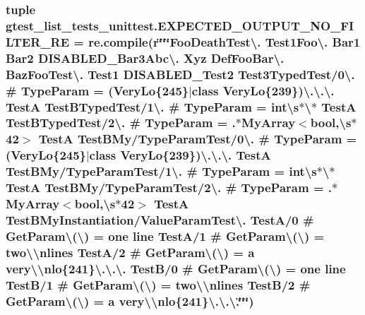 \hypertarget{namespacegtest__list__tests__unittest_a57e38bc2bb7e78ba6b2ae48a1569d1f3}{
\subsubsection[{E\-X\-P\-E\-C\-T\-E\-D\-\_\-\-O\-U\-T\-P\-U\-T\-\_\-\-N\-O\-\_\-\-F\-I\-L\-T\-E\-R\-\_\-\-R\-E}]{\setlength{\rightskip}{0pt plus 5cm}tuple gtest\-\_\-list\-\_\-tests\-\_\-unittest.\-E\-X\-P\-E\-C\-T\-E\-D\-\_\-\-O\-U\-T\-P\-U\-T\-\_\-\-N\-O\-\_\-\-F\-I\-L\-T\-E\-R\-\_\-\-R\-E = re.\-compile(r\char`\"{}\char`\"{}\char`\"{}Foo\-Death\-Test\textbackslash{}. Test1\-Foo\textbackslash{}. Bar1 Bar2 D\-I\-S\-A\-B\-L\-E\-D\-\_\-\-Bar3\-Abc\textbackslash{}. Xyz Def\-Foo\-Bar\textbackslash{}. Baz\-Foo\-Test\textbackslash{}. Test1 D\-I\-S\-A\-B\-L\-E\-D\-\_\-\-Test2 Test3\-Typed\-Test/0\textbackslash{}. \# Type\-Param = (Very\-Lo\{245\}$\vert$class Very\-Lo\{239\})\textbackslash{}.\textbackslash{}.\textbackslash{}. Test\-A Test\-B\-Typed\-Test/1\textbackslash{}. \# Type\-Param = int\textbackslash{}s$\ast$\textbackslash{}$\ast$ Test\-A Test\-B\-Typed\-Test/2\textbackslash{}. \# Type\-Param = .$\ast${\bf My\-Array}$<$bool,\textbackslash{}s$\ast$42$>$ Test\-A Test\-B\-My/{\bf Type\-Param\-Test}/0\textbackslash{}. \# Type\-Param = (Very\-Lo\{245\}$\vert$class Very\-Lo\{239\})\textbackslash{}.\textbackslash{}.\textbackslash{}. Test\-A Test\-B\-My/{\bf Type\-Param\-Test}/1\textbackslash{}. \# Type\-Param = int\textbackslash{}s$\ast$\textbackslash{}$\ast$ Test\-A Test\-B\-My/{\bf Type\-Param\-Test}/2\textbackslash{}. \# Type\-Param = .$\ast${\bf My\-Array}$<$bool,\textbackslash{}s$\ast$42$>$ Test\-A Test\-B\-My\-Instantiation/Value\-Param\-Test\textbackslash{}. Test\-A/0 \# Get\-Param\textbackslash{}(\textbackslash{}) = one line Test\-A/1 \# Get\-Param\textbackslash{}(\textbackslash{}) = two\textbackslash{}\textbackslash{}nlines Test\-A/2 \# Get\-Param\textbackslash{}(\textbackslash{}) = a very\textbackslash{}\textbackslash{}nlo\{241\}\textbackslash{}.\textbackslash{}.\textbackslash{}. Test\-B/0 \# Get\-Param\textbackslash{}(\textbackslash{}) = one line Test\-B/1 \# Get\-Param\textbackslash{}(\textbackslash{}) = two\textbackslash{}\textbackslash{}nlines Test\-B/2 \# Get\-Param\textbackslash{}(\textbackslash{}) = a very\textbackslash{}\textbackslash{}nlo\{241\}\textbackslash{}.\textbackslash{}.\textbackslash{}.\char`\"{}\char`\"{}\char`\"{})}}\label{namespacegtest__list__tests__unittest_a57e38bc2bb7e78ba6b2ae48a1569d1f3}
